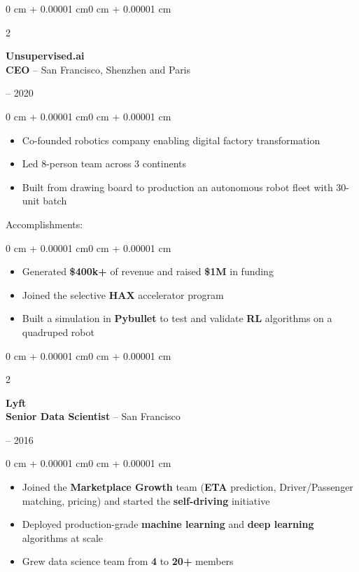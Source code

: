 \documentclass[10pt, letterpaper]{article}
\newenvironment{highlights}{
    \begin{itemize}[
        topsep=0.10 cm,
        parsep=0.10 cm,
        partopsep=0pt,
        itemsep=0pt,
        leftmargin=1.5 cm
    ]
}{
    \end{itemize}
}
\newenvironment{highlightsforbulletentries}{
    \begin{itemize}[
        topsep=0.10 cm,
        parsep=0.10 cm,
        partopsep=0pt,
        itemsep=0pt,
        leftmargin=1.5 cm
    ]
}{
    \end{itemize}
}
\newenvironment{onecolentry}{
    \begin{adjustwidth}{0 cm + 0.00001 cm}{0 cm + 0.00001 cm}
}{
    \end{adjustwidth}
}
\newenvironment{twocolentry}[2][]{
    \onecolentry
    \def\secondColumn{#2}
    \setcolumnwidth{\fill, 4.5 cm}
    \begin{paracol}{2}
}{
    \switchcolumn \raggedleft \secondColumn
    \end{paracol}
    \endonecolentry
}
\begin{document}
    \begin{twocolentry}{2016 -- 2020}
        \textbf{Unsupervised.ai} \\
        \textbf{CEO} -- San Francisco, Shenzhen and Paris
    \end{twocolentry}
    \begin{onecolentry}
        \begin{highlights}
            \item Co-founded robotics company enabling digital factory transformation
            \item Led 8-person team across 3 continents
            \item Built from drawing board to production an autonomous robot fleet with 30-unit batch
        \end{highlights}
    \end{onecolentry}

    Accomplishments:
    \begin{onecolentry}
        \begin{highlightsforbulletentries}
            \item Generated \textbf{\$400k+} of revenue and raised \textbf{\$1M} in funding
            \item Joined the selective \textbf{HAX} accelerator program
            \item Built a simulation in \textbf{Pybullet} to test and validate \textbf{RL} algorithms on a quadruped robot
        \end{highlightsforbulletentries}
    \end{onecolentry}

    \vspace{0.5cm}

    \begin{twocolentry}{2014 -- 2016}
        \textbf{Lyft} \\
        \textbf{Senior Data Scientist} -- San Francisco
    \end{twocolentry}
    \begin{onecolentry}
        \begin{highlights}
            \item Joined the \textbf{Marketplace Growth} team (\textbf{ETA} prediction, Driver/Passenger matching, pricing) and started the \textbf{self-driving} initiative
            \item Deployed production-grade \textbf{machine learning} and \textbf{deep learning} algorithms at scale
            \item Grew data science team from \textbf{4} to \textbf{20+} members
        \end{highlights}
    \end{onecolentry}
\end{document}
